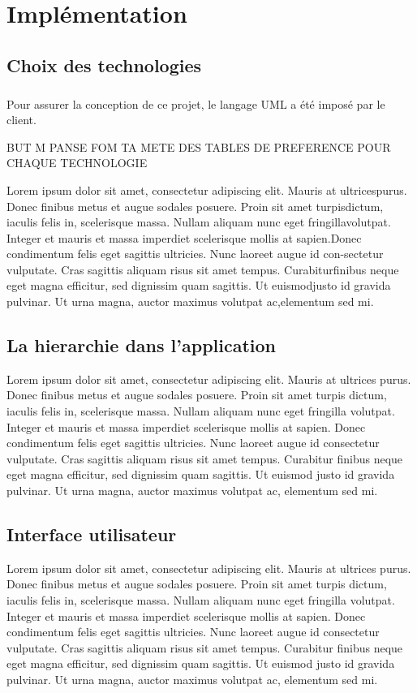 \chapter{Implémentation}
        \section{Choix des technologies}
\paragraph{}   
Pour assurer la conception de ce projet, le langage UML
a été imposé par le client.

BUT M PANSE FOM TA METE DES TABLES DE PREFERENCE POUR CHAQUE TECHNOLOGIE
\par Lorem ipsum dolor sit amet, consectetur adipiscing elit.  Mauris at ultricespurus.  Donec finibus metus et augue sodales posuere.  Proin sit amet turpisdictum, iaculis felis in, scelerisque massa.  Nullam aliquam nunc eget fringillavolutpat.  Integer et mauris et massa imperdiet scelerisque mollis at sapien.Donec condimentum felis eget sagittis ultricies.  Nunc laoreet augue id con-sectetur vulputate.  Cras sagittis aliquam risus sit amet tempus.  Curabiturfinibus neque eget magna efficitur, sed dignissim quam sagittis.  Ut euismodjusto  id  gravida  pulvinar.   Ut  urna  magna,  auctor  maximus  volutpat  ac,elementum sed mi.
        \section{La hierarchie dans l'application}
        Lorem ipsum dolor sit amet, consectetur adipiscing elit. Mauris at ultrices purus. Donec finibus metus et augue sodales posuere. Proin sit amet turpis dictum, iaculis felis in, scelerisque massa. Nullam aliquam nunc eget fringilla volutpat. Integer et mauris et massa imperdiet scelerisque mollis at sapien. Donec condimentum felis eget sagittis ultricies. Nunc laoreet augue id consectetur vulputate. Cras sagittis aliquam risus sit amet tempus. Curabitur finibus neque eget magna efficitur, sed dignissim quam sagittis. Ut euismod justo id gravida pulvinar. Ut urna magna, auctor maximus volutpat ac, elementum sed mi.
        \section{Interface utilisateur}
        Lorem ipsum dolor sit amet, consectetur adipiscing elit. Mauris at ultrices purus. Donec finibus metus et augue sodales posuere. Proin sit amet turpis dictum, iaculis felis in, scelerisque massa. Nullam aliquam nunc eget fringilla volutpat. Integer et mauris et massa imperdiet scelerisque mollis at sapien. Donec condimentum felis eget sagittis ultricies. Nunc laoreet augue id consectetur vulputate. Cras sagittis aliquam risus sit amet tempus. Curabitur finibus neque eget magna efficitur, sed dignissim quam sagittis. Ut euismod justo id gravida pulvinar. Ut urna magna, auctor maximus volutpat ac, elementum sed mi.
        